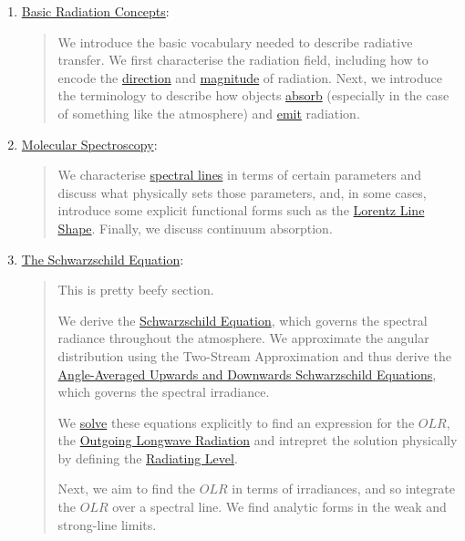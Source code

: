 \begin{enumerate}
    \item \hyperref[Basic Thermodynamics]{Basic Radiation Concepts}: 
        
        \begin{quote}
            We introduce the basic vocabulary needed to describe radiative transfer. We first characterise the radiation field, including how to encode the \hyperref[Solid Angle Box]{direction} and \hyperref[Radiance Box]{magnitude} of radiation. Next, we introduce the terminology to describe how objects \hyperref[Optical Depth Box]{absorb} (especially in the case of something like the atmosphere) and \hyperref[Emission Box]{emit} radiation.
        \end{quote}

    \item \hyperref[Molecular Spectroscopy]{Molecular Spectroscopy}: 
    
        \begin{quote}
            We characterise \hyperref[Line Box]{spectral lines} in terms of certain parameters and discuss what physically sets those parameters, and, in some cases, introduce some explicit functional forms such as the \hyperref[Lorentz Box]{Lorentz Line Shape}. Finally, we discuss continuum absorption.
        \end{quote}
    
    \item \hyperref[Schwarzschild Section]{The Schwarzschild Equation}:
        
        \begin{quote}
            This is pretty beefy section.

            We derive the \hyperref[Schwarzschild]{Schwarzschild Equation}, which governs the spectral radiance throughout the atmosphere. We approximate the angular distribution using the Two-Stream Approximation and thus derive the \hyperref[Scharz box]{Angle-Averaged Upwards and Downwards Schwarzschild Equations}, which governs the spectral irradiance. 
            
            We \hyperref[Soln Schwarszchild Box]{solve} these equations explicitly to find an expression for the $OLR$, the \hyperref[OLR Soln]{Outgoing Longwave Radiation} and intrepret the solution physically by defining the \hyperref[rad level box]{Radiating Level}.

            Next, we aim to find the $OLR$ in terms of irradiances, and so integrate the $OLR$ over a spectral line. We find analytic forms in the weak and strong-line limits. 
            

\end{quote}
\end{enumerate}
